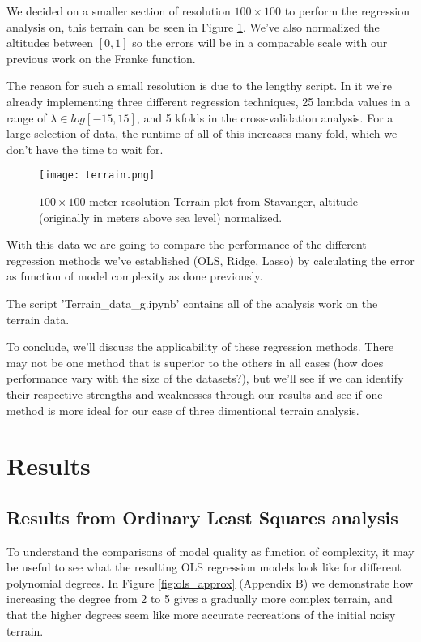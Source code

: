 \documentclass[reprint,english,notitlepage]{revtex4-1}  %
\begin{document}
We decided on a smaller section of resolution $100 \times 100$ to perform the regression analysis on, this terrain can be seen in Figure \ref{fig:terrain}. We've also normalized the altitudes between $[0, 1]$ so the errors will be in a comparable scale with our previous work on the Franke function.

The reason for such a small resolution is due to the lengthy script. In it we're already implementing three different regression techniques, 25 lambda values in a range of $\lambda \in log[-15, 15]$, and 5 kfolds in the cross-validation analysis. For a large selection of data, the runtime of all of this increases many-fold, which we don't have the time to wait for.

\begin{figure}[h!]
    \centering
    \texttt{[image: terrain.png]}
    \caption{$100 \times 100$ meter resolution Terrain plot from Stavanger, altitude (originally in meters above sea level) normalized.}
    \label{fig:terrain}
\end{figure}

With this data we are going to compare the performance of the different regression methods we've established (OLS, Ridge, Lasso) by calculating the error as function of model complexity as done previously.

The script 'Terrain\_data\_g.ipynb' contains all of the analysis work on the terrain data.

To conclude, we'll discuss the applicability of these regression methods. There may not be one method that is superior to the others in all cases (how does performance vary with the size of the datasets?), but we'll see if we can identify their respective strengths and weaknesses through our results and see if one method is more ideal for our case of three dimentional terrain analysis. 

\section{Results}

\subsection{Results from Ordinary Least Squares analysis}

To understand the comparisons of model quality as function of complexity, it may be useful to see what the resulting OLS regression models look like for different polynomial degrees. In Figure \ref{fig:ols_approx} (Appendix B) we demonstrate how increasing the degree from 2 to 5 gives a gradually more complex terrain, and that the higher degrees seem like more accurate recreations of the initial noisy terrain.
\end{document}
